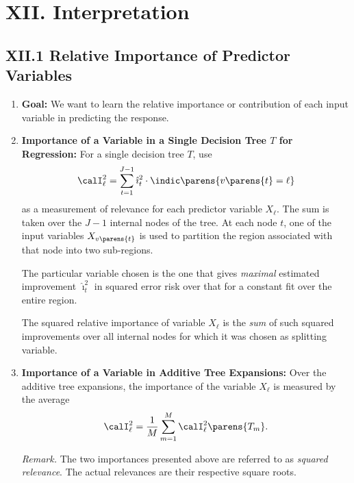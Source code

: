 \documentclass[12pt]{article}
\begin{document}
\section*{XII. Interpretation}

\subsection*{XII.1 Relative Importance of Predictor Variables}

\begin{enumerate}[label=\textbf{\arabic*.}]

	\item \textbf{Goal:} We want to learn the relative importance or contribution of each input variable in predicting the response. 
	
	\item \textbf{Importance of a Variable in a Single Decision Tree $T$ for Regression:} For a single decision tree $T$, use 
	\begin{align}
		\calI_{\ell}^2 = \sum_{t=1}^{J-1} \hat{\imath}^2_t \cdot \indic \parens{v \parens{t} = \ell}
	\end{align}
	as a measurement of relevance for each predictor variable $X_{\ell}$. The sum is taken over the $J-1$ internal nodes of the tree. At each node $t$, one of the input variables $X_{v \parens{t}}$ is used to partition the region associated with that node into two sub-regions. 
	
	The particular variable chosen is the one that gives \textit{maximal} estimated improvement $\hat{\imath}_t^2$ in squared error risk over that for a constant fit over the entire region. 
	
	The squared relative importance of variable $X_{\ell}$ is the \emph{sum} of such squared improvements over all internal nodes for which it was chosen as splitting variable. 
	
	\item \textbf{Importance of a Variable in Additive Tree Expansions:} Over the additive tree expansions, the importance of the variable $X_{\ell}$ is measured by the average 
	\begin{align}\label{eq-importance-additive}
		\calI_{\ell}^2 = \frac{1}{M} \sum_{m=1}^M \calI_{\ell}^2 \parens{T_m}. 
	\end{align}
	
	\textit{Remark.} The two importances presented above are referred to as \textit{squared relevance}. The actual relevances are their respective square roots. 
	

\end{enumerate}
\end{document}
